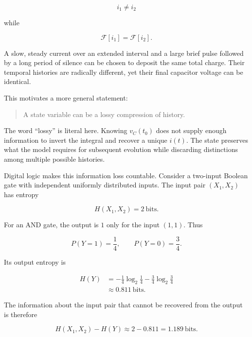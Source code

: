 \documentclass[11pt]{article}
\begin{document}
\begin{equation}
i_1\neq i_2
\end{equation}

while

\begin{equation}
\mathcal F[i_1]
=
\mathcal F[i_2].
\end{equation}

A slow, steady current over an extended interval and a large brief pulse followed by a long period of silence can be chosen to deposit the same total charge. Their temporal histories are radically different, yet their final capacitor voltage can be identical.

This motivates a more general statement:

\begin{quote}
A state variable can be a lossy compression of history.
\end{quote}

The word ``lossy'' is literal here. Knowing $v_C(t_0)$ does not supply enough information to invert the integral and recover a unique $i(t)$. The state preserves what the model requires for subsequent evolution while discarding distinctions among multiple possible histories.

Digital logic makes this information loss countable. Consider a two-input Boolean gate with independent uniformly distributed inputs. The input pair $(X_1,X_2)$ has entropy

\begin{equation}
H(X_1,X_2)=2\ \text{bits}.
\end{equation}

For an AND gate, the output is $1$ only for the input $(1,1)$. Thus

\begin{equation}
P(Y=1)=\frac14,
\qquad
P(Y=0)=\frac34.
\end{equation}

Its output entropy is

\begin{align}
H(Y)
&=
-\frac14\log_2\frac14
-\frac34\log_2\frac34\\
&\approx0.811\ \text{bits}.
\end{align}

The information about the input pair that cannot be recovered from the output is therefore

\begin{equation}
H(X_1,X_2)-H(Y)
\approx
2-0.811
=
1.189\ \text{bits}.
\end{equation}
\end{document}
